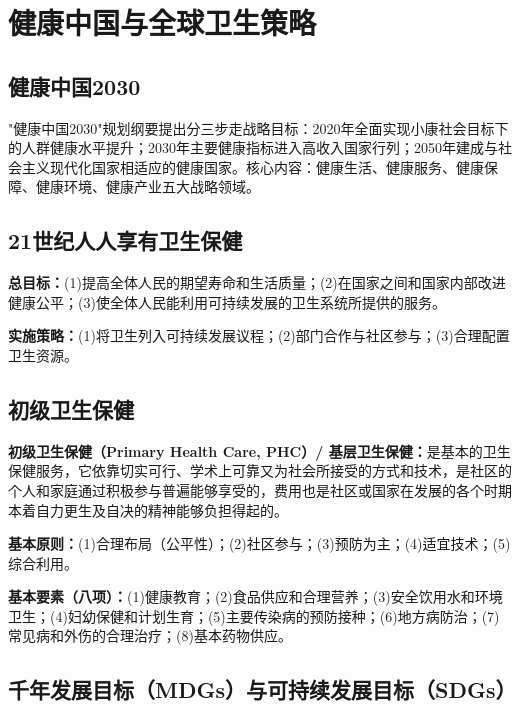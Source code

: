 \section{健康中国与全球卫生策略}

\subsection{健康中国2030}

\begin{defbox}
"健康中国2030"规划纲要提出分三步走战略目标：2020年全面实现小康社会目标下的人群健康水平提升；2030年主要健康指标进入高收入国家行列；2050年建成与社会主义现代化国家相适应的健康国家。核心内容：健康生活、健康服务、健康保障、健康环境、健康产业五大战略领域。
\end{defbox}

\subsection{21世纪人人享有卫生保健}

\begin{defbox}
\textbf{总目标：}(1)提高全体人民的期望寿命和生活质量；(2)在国家之间和国家内部改进健康公平；(3)使全体人民能利用可持续发展的卫生系统所提供的服务。

\textbf{实施策略：}(1)将卫生列入可持续发展议程；(2)部门合作与社区参与；(3)合理配置卫生资源。
\end{defbox}

\subsection{初级卫生保健}

\begin{keybox}
\textbf{初级卫生保健（Primary Health Care, PHC）/ 基层卫生保健：}是基本的卫生保健服务，它依靠切实可行、学术上可靠又为社会所接受的方式和技术，是社区的个人和家庭通过积极参与普遍能够享受的，费用也是社区或国家在发展的各个时期本着自力更生及自决的精神能够负担得起的。

\textbf{基本原则：}(1)合理布局（公平性）；(2)社区参与；(3)预防为主；(4)适宜技术；(5)综合利用。

\textbf{基本要素（八项）：}(1)健康教育；(2)食品供应和合理营养；(3)安全饮用水和环境卫生；(4)妇幼保健和计划生育；(5)主要传染病的预防接种；(6)地方病防治；(7)常见病和外伤的合理治疗；(8)基本药物供应。
\end{keybox}

\subsection{千年发展目标（MDGs）与可持续发展目标（SDGs）}

